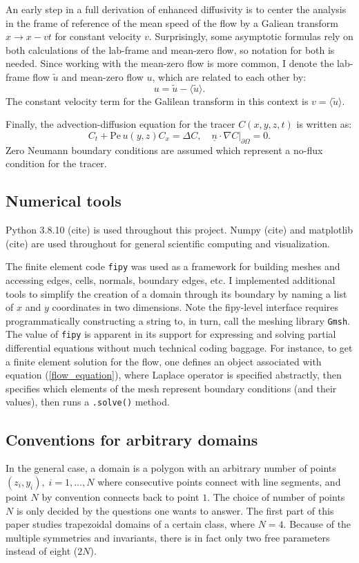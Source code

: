 \documentclass{amsart}
\begin{document}
An early step in a full derivation of enhanced diffusivity 
is to center the analysis in the frame of reference of the 
mean speed of the flow by a Galiean transform $x \to x - vt$ for constant velocity $v$. 
Surprisingly, some asymptotic formulas rely on both 
calculations of the lab-frame and mean-zero flow, so notation for both is needed. 
Since working with the mean-zero flow is more common, 
I denote the lab-frame flow $\tilde{u}$ and mean-zero flow $u$, which are related to 
each other by:
%
\begin{equation}
u = \tilde{u} - \langle \tilde{u} \rangle.
\end{equation}
%
The constant velocity term for the Galilean transform in this context 
is $v = \langle \tilde{u} \rangle$.

Finally, the advection-diffusion equation for the tracer $C(x,y,z,t)$ is written 
as: 
\begin{equation}
C_t + \mathrm{Pe} \, u(y,z) C_x = \Delta C, \quad \left. \underline{n} \cdot \nabla C\right|_{\partial \Omega} = 0.
\end{equation}
Zero Neumann boundary conditions are assumed which represent a no-flux condition 
for the tracer.

\subsection{Numerical tools}
Python 3.8.10 (cite) is used throughout this project. Numpy (cite) and 
matplotlib (cite)  are used throughout for general scientific 
computing and visualization.

The finite element code \texttt{fipy} was used as a framework for 
building meshes and accessing edges, cells, normals, boundary edges, etc. 
I implemented additional tools to simplify the creation of 
a domain through its boundary by naming a list of $x$ and $y$ coordinates in 
two dimensions. 
Note the fipy-level interface requires programmatically constructing a string to, 
in turn, call the meshing library \texttt{Gmsh}. 
The value of \texttt{fipy} is apparent in its support for expressing 
and solving partial differential equations without much technical coding baggage. 
For instance, to get a finite element solution for the flow, 
one defines an object associated with 
equation (\ref{flow_equation}), where Laplace operator is specified abstractly, 
then specifies which elements of the mesh 
represent boundary conditions (and their values), then runs a 
\texttt{.solve()} method. 

\subsection{Conventions for arbitrary domains}
In the general case, a domain is a polygon with an arbitrary 
number of points ${(z_i, y_i), \; i=1,\ldots,N }$ where 
consecutive points connect with line segments, and point $N$ by convention connects 
back to point $1$. The choice of number of points $N$ is only decided by the questions 
one wants to answer. The first part of this paper studies trapezoidal 
domains of a certain class, where $N=4$. Because of the multiple symmetries and 
invariants, there is in fact only two free parameters instead of eight ($2N$).
\end{document}
